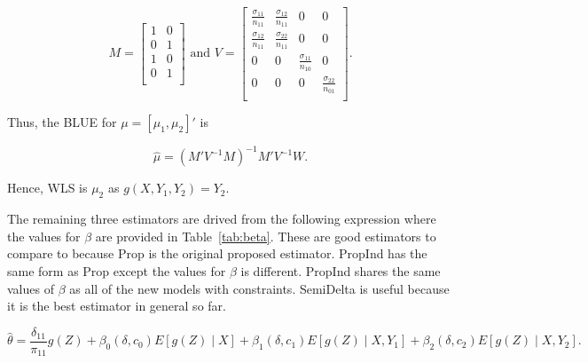 \documentclass[12pt]{article}
\begin{document}
    \[M = 
      \begin{bmatrix}
        1 & 0 \\
        0 & 1 \\
        1 & 0 \\
        0 & 1 \\
      \end{bmatrix}
      \text{ and }
      V = 
      \begin{bmatrix}
        \frac{\sigma_{11}}{n_{11}} & \frac{\sigma_{12}}{n_{11}} & 0 & 0 \\
        \frac{\sigma_{12}}{n_{11}} & \frac{\sigma_{22}}{n_{11}} & 0 & 0 \\
        0 & 0 & \frac{\sigma_{11}}{n_{10}} & 0 \\
        0 & 0 & 0 & \frac{\sigma_{22}}{n_{01}} \\
      \end{bmatrix}.
    \]

    Thus, the BLUE for $\mu = [\mu_1, \mu_2]'$ is 

    \[\hat \mu = (M' V^{-1} M)^{-1} M' V^{-1} W.\]

    Hence, WLS is $\mu_2$ as $g(X, Y_1, Y_2) = Y_2$.


The remaining three estimators are drived from the following expression
where the values for $\beta$ are provided in Table~\ref{tab:beta}. These 
are good estimators to compare to because Prop is the original proposed 
estimator. PropInd has the same form as Prop except the values for $\beta$ 
is different. PropInd shares the same values of $\beta$ as all of the new 
models with constraints. SemiDelta is useful because it is the best 
estimator in general so far.

\[\hat \theta = \frac{\delta_{11}}{\pi_{11}}g(Z) + \beta_0(\delta, c_0)E[g(Z)
\mid X] + \beta_1(\delta, c_1)E[g(Z) \mid X, Y_1] + \beta_2(\delta, c_2) E[g(Z)
\mid X, Y_2].\]
\end{document}
